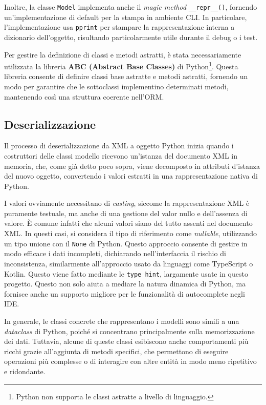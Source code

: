 Inoltre, la classe \texttt{Model} implementa anche il \emph{magic method} \texttt{\_\_repr\_\_()}, fornendo un'implementazione di default per la stampa in ambiente CLI. In particolare, l'implementazione usa \texttt{pprint} per stampare la rappresentazione interna a dizionario dell'oggetto, risultando particolarmente utile durante il debug o i test.

Per gestire la definizione di classi e metodi astratti, è stata necessariamente utilizzata la libreria \textbf{ABC (Abstract Base Classes)} di Python\footnote{Python non supporta le classi astratte a livello di linguaggio.}. Questa libreria consente di definire classi base astratte e metodi astratti, fornendo un modo per garantire che le sottoclassi implementino determinati metodi, mantenendo così una struttura coerente nell'ORM.

\subsection{Deserializzazione}
Il processo di deserializzazione da XML a oggetto Python inizia quando i costruttori delle classi modello ricevono un'istanza del documento XML in memoria, che, come già detto poco sopra, viene decomposto in attributi d'istanza del nuovo oggetto, convertendo i valori estratti in una rappresentazione nativa di Python.

I valori ovviamente necessitano di \emph{casting}, siccome la rappresentazione XML è puramente testuale, ma anche di una gestione del valor nullo e dell'assenza di valore. È comune infatti che alcuni valori siano del tutto assenti nel documento XML. In questi casi, si considera il tipo di riferimento come \emph{nullable}, utilizzando un tipo unione con il \texttt{None} di Python. Questo approccio consente di gestire in modo efficace i dati incompleti, dichiarando nell'interfaccia il rischio di inconsistenza, similarmente all'approccio usato da linguaggi come TypeScript o Kotlin. Questo viene fatto mediante le \texttt{type hint}, largamente usate in questo progetto. Questo non solo aiuta a mediare la natura dinamica di Python, ma fornisce anche un supporto migliore per le funzionalità di autocomplete negli IDE.

In generale, le classi concrete che rappresentano i modelli sono simili a una \emph{dataclass} di Python, poiché si concentrano principalmente sulla memorizzazione dei dati. Tuttavia, alcune di queste classi esibiscono anche comportamenti più ricchi grazie all'aggiunta di metodi specifici, che permettono di eseguire operazioni più complesse o di interagire con altre entità in modo meno ripetitivo e ridondante.


